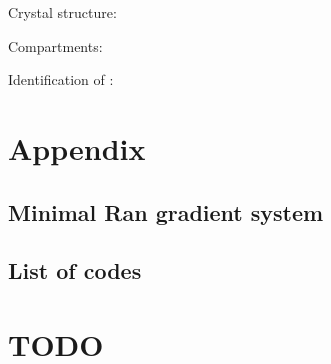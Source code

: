 \documentclass[12pt,notitlepage]{article}
\begin{document}
Crystal structure: \cite{SaricETAL2007}




Compartments: \cite{Hofmeyr2020}


Identification of :
\cite{KutayETAL1997}




\clearpage
\renewcommand*{\bibfont}{\normalfont\small}
\printbibliography %



\clearpage


\section{Appendix}

\subsection{Minimal Ran gradient system} \label{ss:gsr-ran}



\subsection{List of codes}

\begin{center}
\SHOWCODES
\end{center}



\section{TODO}
\SHOWTODOS



\leavevmode\vfill{\tiny\color{lightgray}\hfill{\DTMnow}}
\end{document}

